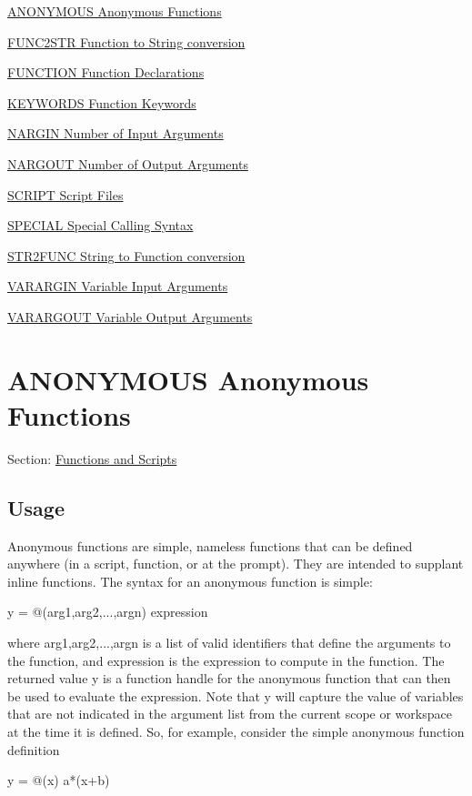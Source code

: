 
\begin{DoxyItemize}
\item \hyperlink{functions_anonymous}{A\-N\-O\-N\-Y\-M\-O\-U\-S Anonymous Functions}  
\item \hyperlink{functions_func2str}{F\-U\-N\-C2\-S\-T\-R Function to String conversion}  
\item \hyperlink{functions_function}{F\-U\-N\-C\-T\-I\-O\-N Function Declarations}  
\item \hyperlink{functions_keywords}{K\-E\-Y\-W\-O\-R\-D\-S Function Keywords}  
\item \hyperlink{functions_nargin}{N\-A\-R\-G\-I\-N Number of Input Arguments}  
\item \hyperlink{functions_nargout}{N\-A\-R\-G\-O\-U\-T Number of Output Arguments}  
\item \hyperlink{functions_script}{S\-C\-R\-I\-P\-T Script Files}  
\item \hyperlink{functions_special}{S\-P\-E\-C\-I\-A\-L Special Calling Syntax}  
\item \hyperlink{functions_str2func}{S\-T\-R2\-F\-U\-N\-C String to Function conversion}  
\item \hyperlink{functions_varargin}{V\-A\-R\-A\-R\-G\-I\-N Variable Input Arguments}  
\item \hyperlink{functions_varargout}{V\-A\-R\-A\-R\-G\-O\-U\-T Variable Output Arguments}  
\end{DoxyItemize}\hypertarget{functions_anonymous}{}\section{A\-N\-O\-N\-Y\-M\-O\-U\-S Anonymous Functions}\label{functions_anonymous}
Section\-: \hyperlink{sec_functions}{Functions and Scripts} \hypertarget{vtkwidgets_vtkxyplotwidget_Usage}{}\subsection{Usage}\label{vtkwidgets_vtkxyplotwidget_Usage}
Anonymous functions are simple, nameless functions that can be defined anywhere (in a script, function, or at the prompt). They are intended to supplant {\ttfamily inline} functions. The syntax for an anonymous function is simple\-: \begin{DoxyVerb}   y = @(arg1,arg2,...,argn) expression
\end{DoxyVerb}
 where {\ttfamily arg1,arg2,...,argn} is a list of valid identifiers that define the arguments to the function, and {\ttfamily expression} is the expression to compute in the function. The returned value {\ttfamily y} is a function handle for the anonymous function that can then be used to evaluate the expression. Note that {\ttfamily y} will capture the value of variables that are not indicated in the argument list from the current scope or workspace at the time it is defined. So, for example, consider the simple anonymous function definition \begin{DoxyVerb}   y = @(x) a*(x+b)
\end{DoxyVerb}
